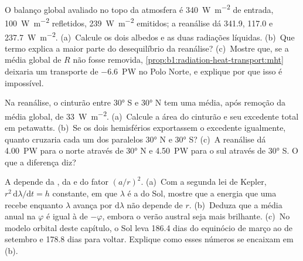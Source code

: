 \begin{exercise}[$\star\star$]\label{exo:b1:radiation-heat-transport:8}
O balanço global avaliado no topo da atmosfera é \qty{340}{W.m^{-2}} de entrada, \qty{100}{W.m^{-2}}
refletidos, \qty{239}{W.m^{-2}} emitidos; a reanálise dá \qty{341.9}{}, \qty{117.0}{} e
\qty{237.7}{W.m^{-2}}. (a)~Calcule os dois albedos e as duas radiações líquidas. (b)~Que termo
explica a maior parte do desequilíbrio da reanálise? (c)~Mostre que, se a média global de $R$ não
fosse removida, \cref{prop:b1:radiation-heat-transport:mht} deixaria um transporte de
\qty{-6.6}{PW} no Polo Norte, e explique por que isso é impossível.
\end{exercise}

\begin{exercise}[$\star\star$]\label{exo:b1:radiation-heat-transport:9}
Na reanálise, o cinturão entre \ang{30} S e \ang{30} N tem uma  média, após remoção
da média global, de \qty{+33}{W.m^{-2}}. (a)~Calcule a área do cinturão e seu excedente total em
petawatts. (b)~Se os dois hemisférios exportassem o excedente igualmente, quanto cruzaria cada um
dos paralelos \ang{30} N e \ang{30} S? (c)~A reanálise dá \qty{4.00}{PW} para o norte através de
\ang{30} N e \qty{4.50}{PW} para o sul através de \ang{30} S. O que a diferença diz?
\end{exercise}

\begin{exercise}[$\star\star\star$]\label{exo:b1:radiation-heat-transport:10}
A  depende da , da  e do fator $(a/r)^2$. (a)~Com a segunda
lei de Kepler, $r^2\,\mathrm d\lambda/\mathrm dt = h$ constante, em que $\lambda$ é a 
 do Sol, mostre que a energia que uma  recebe enquanto $\lambda$ avança por
$\mathrm d\lambda$ não depende de $r$. (b)~Deduza que a  média anual na  $\varphi$
é igual à de $-\varphi$, embora o verão austral seja mais brilhante. (c)~No modelo orbital deste
capítulo, o Sol leva \num{186.4} dias do equinócio de março ao de setembro e \num{178.8} dias para
voltar. Explique como esses números se encaixam em (b).
\end{exercise}

